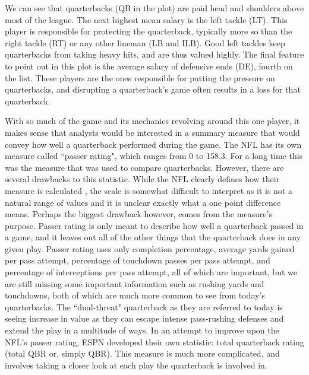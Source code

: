 \documentclass[12pt]{article}\usepackage[]{graphicx}\usepackage[]{color}
\begin{document}
\newpage
We can see that quarterbacks (QB in the plot) are paid head and shoulders above most of the league. The next highest mean salary is the left tackle (LT). This player is responsible for protecting the quarterback, typically more so than the right tackle (RT) or any other lineman (LB and ILB). Good left tackles keep quarterbacks from taking heavy hits, and are thus valued highly. The final feature to point out in this plot is the average salary of defensive ends (DE), fourth on the list. These players are the ones responsible for putting the pressure on quarterbacks, and disrupting a quarterback's game often results in a loss for that quarterback. 

With so much of the game and its mechanics revolving around this one player, it makes sense that analysts would be interested in a summary measure that would convey how well a quarterback performed during the game. The NFL has its own measure called ``passer rating", which ranges from 0 to 158.3. For a long time this was the measure that was used to compare quarterbacks. However, there are several drawbacks to this statistic. While the NFL clearly defines how their measure is calculated \cite{passer}, the scale is somewhat difficult to interpret as it is not a natural range of values and it is unclear exactly what a one point difference means. Perhaps the biggest drawback however, comes from the measure's purpose. Passer rating is only meant to describe how well a quarterback passed in a game, and it leaves out all of the other things that the quarterback does in any given play. Passer rating uses only completion percentage, average yards gained per pass attempt, percentage of touchdown passes per pass attempt, and percentage of interceptions per pass attempt, all of which are important, but we are still missing some important information such as rushing yards and touchdowns, both of which are much more common to see from today's quarterbacks. The ``dual-threat" quarterback as they are referred to today is seeing increase in value as they can escape intense pass-rushing defenses and extend the play in a multitude of ways. In an attempt to improve upon the NFL's passer rating, ESPN developed their own statistic: total quarterback rating (total QBR or, simply QBR). This measure is much more complicated, and involves taking a closer look at each play the quarterback is involved in.
\end{document}
